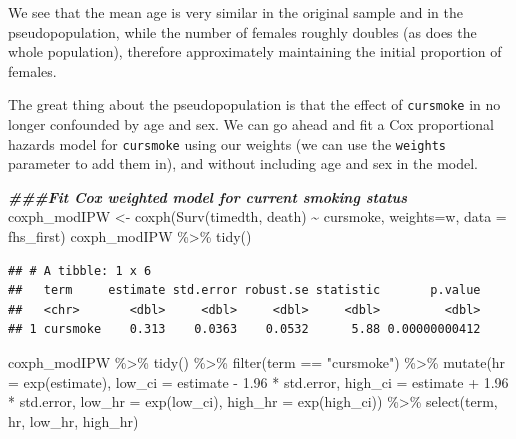 \documentclass[
]{book}
\newenvironment{Shaded}{\begin{snugshade}}{\end{snugshade}}
\newcommand{\AttributeTok}[1]{\textcolor[rgb]{0.77,0.63,0.00}{#1}}
\newcommand{\DocumentationTok}[1]{\textcolor[rgb]{0.56,0.35,0.01}{\textbf{\textit{#1}}}}
\newcommand{\FloatTok}[1]{\textcolor[rgb]{0.00,0.00,0.81}{#1}}
\newcommand{\FunctionTok}[1]{\textcolor[rgb]{0.00,0.00,0.00}{#1}}
\newcommand{\NormalTok}[1]{#1}
\newcommand{\OtherTok}[1]{\textcolor[rgb]{0.56,0.35,0.01}{#1}}
\newcommand{\SpecialCharTok}[1]{\textcolor[rgb]{0.00,0.00,0.00}{#1}}
\newcommand{\StringTok}[1]{\textcolor[rgb]{0.31,0.60,0.02}{#1}}
\begin{document}
We see that the mean age is very similar in the original sample and in the pseudopopulation, while the number of females roughly doubles (as does the whole population), therefore approximately maintaining the initial proportion of females.

The great thing about the pseudopopulation is that the effect of \texttt{cursmoke} in no longer confounded by age and sex.
We can go ahead and fit a Cox proportional hazards model for \texttt{cursmoke} using our weights (we can use the \texttt{weights} parameter to add them in), and without including age and sex in the model.

\begin{Shaded}
\begin{Highlighting}[]
\DocumentationTok{\#\#\#Fit Cox weighted model for current smoking status}
\NormalTok{coxph\_modIPW }\OtherTok{\textless{}{-}} \FunctionTok{coxph}\NormalTok{(}\FunctionTok{Surv}\NormalTok{(timedth, death) }\SpecialCharTok{\textasciitilde{}}\NormalTok{ cursmoke, }\AttributeTok{weights=}\NormalTok{w,}
                    \AttributeTok{data =}\NormalTok{ fhs\_first)}
\NormalTok{coxph\_modIPW }\SpecialCharTok{\%\textgreater{}\%}
  \FunctionTok{tidy}\NormalTok{()}
\end{Highlighting}
\end{Shaded}

\begin{verbatim}
## # A tibble: 1 x 6
##   term     estimate std.error robust.se statistic       p.value
##   <chr>       <dbl>     <dbl>     <dbl>     <dbl>         <dbl>
## 1 cursmoke    0.313    0.0363    0.0532      5.88 0.00000000412
\end{verbatim}

\begin{Shaded}
\begin{Highlighting}[]
\NormalTok{coxph\_modIPW }\SpecialCharTok{\%\textgreater{}\%} 
  \FunctionTok{tidy}\NormalTok{() }\SpecialCharTok{\%\textgreater{}\%} 
  \FunctionTok{filter}\NormalTok{(term }\SpecialCharTok{==} \StringTok{"cursmoke"}\NormalTok{) }\SpecialCharTok{\%\textgreater{}\%} 
  \FunctionTok{mutate}\NormalTok{(}\AttributeTok{hr =} \FunctionTok{exp}\NormalTok{(estimate),}
         \AttributeTok{low\_ci =}\NormalTok{ estimate }\SpecialCharTok{{-}} \FloatTok{1.96} \SpecialCharTok{*}\NormalTok{ std.error, }
         \AttributeTok{high\_ci =}\NormalTok{ estimate }\SpecialCharTok{+} \FloatTok{1.96} \SpecialCharTok{*}\NormalTok{ std.error, }
         \AttributeTok{low\_hr =} \FunctionTok{exp}\NormalTok{(low\_ci), }
         \AttributeTok{high\_hr =} \FunctionTok{exp}\NormalTok{(high\_ci)) }\SpecialCharTok{\%\textgreater{}\%} 
  \FunctionTok{select}\NormalTok{(term, hr, low\_hr, high\_hr)}
\end{Highlighting}
\end{Shaded}
\end{document}
